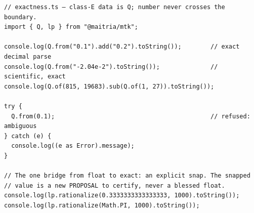 \begin{Verbatim}[fontsize=\small,frame=leftline,rulecolor=\color{accentmid},framesep=3mm,xleftmargin=3mm]
// exactness.ts — class-E data is Q; number never crosses the boundary.
import { Q, lp } from "@maitria/mtk";

console.log(Q.from("0.1").add("0.2").toString());        // exact decimal parse
console.log(Q.from("-2.04e-2").toString());              // scientific, exact
console.log(Q.of(815, 19683).sub(Q.of(1, 27)).toString());

try {
  Q.from(0.1);                                           // refused: ambiguous
} catch (e) {
  console.log((e as Error).message);
}

// The one bridge from float to exact: an explicit snap. The snapped
// value is a new PROPOSAL to certify, never a blessed float.
console.log(lp.rationalize(0.3333333333333333, 1000).toString());
console.log(lp.rationalize(Math.PI, 1000).toString());
\end{Verbatim}
